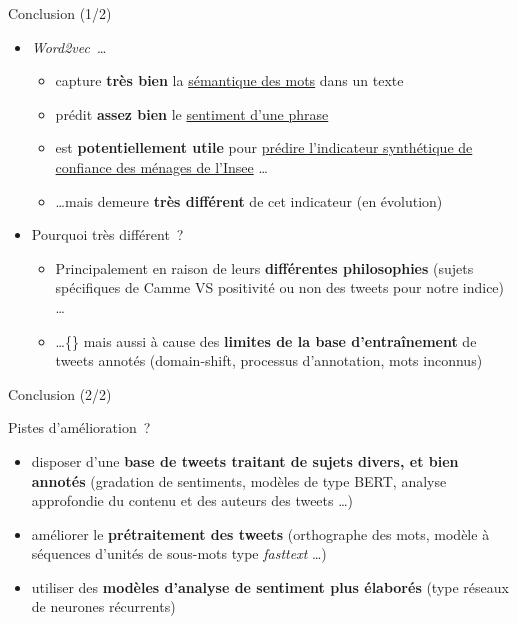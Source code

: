 \documentclass[10pt,xcolor=table,color={dvipsnames,usenames},ignorenonframetext,usepdftitle=false,french]{beamer}
\providecommand{\tightlist}{%
  \setlength{\parskip}{0pt}
  }
\begin{document}
\begin{frame}{Conclusion (1/2)}
\protect\hypertarget{conclusion-12}{}

\begin{itemize}
\tightlist
\item
  \emph{Word2vec}~\dots

  \begin{itemize}
  \tightlist
  \item
    capture \textbf{très bien} la \underline{sémantique des mots} dans
    un texte
  \item
    prédit \textbf{assez bien} le \underline{sentiment d’une phrase}
  \item
    est \textbf{potentiellement utile} pour
    \underline{prédire l’indicateur synthétique de}
    \underline{confiance des ménages de l’Insee} \dots
  \item
    \dots mais demeure \textbf{très différent} de cet indicateur (en
    évolution)
  \end{itemize}
\end{itemize}

\bigskip

\pause

\begin{itemize}
\tightlist
\item
  Pourquoi très différent~?

  \begin{itemize}
  \tightlist
  \item
    Principalement en raison de leurs \textbf{différentes philosophies}
    \footnotesize (sujets spécifiques de Camme VS positivité ou non des
    tweets pour notre indice) \normalsize \dots
  \item
    \dots\{\} mais aussi à cause des \textbf{limites de la base
    d’entraînement} de tweets annotés \footnotesize (domain-shift,
    processus d’annotation, mots inconnus) \normalsize
  \end{itemize}
\end{itemize}

\end{frame}

\begin{frame}{Conclusion (2/2)}
\protect\hypertarget{conclusion-22}{}

Pistes d’amélioration~?

\begin{itemize}
\item
  disposer d’une \textbf{base de tweets traitant de sujets divers, et
  bien annotés} \footnotesize (gradation de sentiments, modèles de type
  BERT, analyse approfondie du contenu et des auteurs des tweets \dots)
  \normalsize
\item
  améliorer le \textbf{prétraitement des tweets}
  \footnotesize (orthographe des mots, modèle à séquences d’unités de
  sous-mots type \emph{fasttext} \dots)\normalsize
\item
  utiliser des \textbf{modèles d’analyse de sentiment plus élaborés}
  \footnotesize  (type réseaux de neurones récurrents)\normalsize
\end{itemize}

\end{frame}
\end{document}
